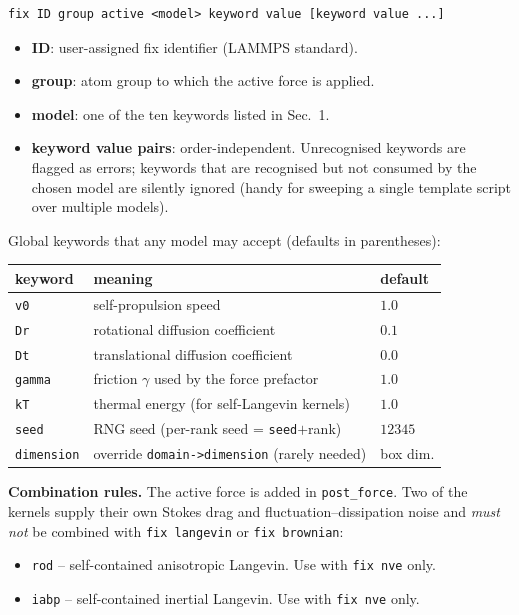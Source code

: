 \documentclass[11pt,a4paper]{article}
\begin{document}
\begin{lstlisting}
fix ID group active <model> keyword value [keyword value ...]
\end{lstlisting}

\begin{itemize}
\item \textbf{ID}: user-assigned fix identifier (LAMMPS standard).
\item \textbf{group}: atom group to which the active force is applied.
\item \textbf{model}: one of the ten keywords listed in Sec.~1.
\item \textbf{keyword value pairs}: order-independent.  Unrecognised
      keywords are flagged as errors; keywords that are recognised but not
      consumed by the chosen model are silently ignored (handy for sweeping
      a single template script over multiple models).
\end{itemize}

\noindent
Global keywords that any model may accept (defaults in parentheses):
\begin{center}
\begin{tabular}{l l l}
\toprule
keyword & meaning & default \\
\midrule
\texttt{v0}        & self-propulsion speed                   & $1.0$ \\
\texttt{Dr}        & rotational diffusion coefficient        & $0.1$ \\
\texttt{Dt}        & translational diffusion coefficient     & $0.0$ \\
\texttt{gamma}     & friction $\gamma$ used by the force prefactor & $1.0$ \\
\texttt{kT}        & thermal energy (for self-Langevin kernels) & $1.0$ \\
\texttt{seed}      & RNG seed (per-rank seed = \texttt{seed}$+$rank) & $12345$ \\
\texttt{dimension} & override \texttt{domain->dimension} (rarely needed)    & box dim. \\
\bottomrule
\end{tabular}
\end{center}

\noindent
\textbf{Combination rules.}  The active force is added in
\texttt{post\_force}.  Two of the kernels supply their own Stokes drag and
fluctuation--dissipation noise and \emph{must not} be combined with
\texttt{fix langevin} or \texttt{fix brownian}:

\begin{itemize}
\item \texttt{rod}  -- self-contained anisotropic Langevin.  Use with \texttt{fix nve} only.
\item \texttt{iabp} -- self-contained inertial Langevin.  Use with \texttt{fix nve} only.
\end{itemize}
\end{document}
